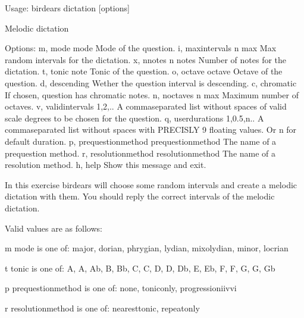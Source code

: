 \documentclass[letterpaper,10pt,english]{sphinxmanual}
\begin{document}
\begin{sphinxVerbatim}[commandchars=\\\{\}]
Usage: birdears dictation [options]

  Melodic dictation

Options:
  \PYGZhy{}m, \PYGZhy{}\PYGZhy{}mode \PYGZlt{}mode\PYGZgt{}               Mode of the question.
  \PYGZhy{}i, \PYGZhy{}\PYGZhy{}max\PYGZus{}intervals \PYGZlt{}n max\PYGZgt{}     Max random intervals for the dictation.
  \PYGZhy{}x, \PYGZhy{}\PYGZhy{}n\PYGZus{}notes \PYGZlt{}n notes\PYGZgt{}         Number of notes for the dictation.
  \PYGZhy{}t, \PYGZhy{}\PYGZhy{}tonic \PYGZlt{}note\PYGZgt{}              Tonic of the question.
  \PYGZhy{}o, \PYGZhy{}\PYGZhy{}octave \PYGZlt{}octave\PYGZgt{}           Octave of the question.
  \PYGZhy{}d, \PYGZhy{}\PYGZhy{}descending                Wether the question interval is descending.
  \PYGZhy{}c, \PYGZhy{}\PYGZhy{}chromatic                 If chosen, question has chromatic notes.
  \PYGZhy{}n, \PYGZhy{}\PYGZhy{}n\PYGZus{}octaves \PYGZlt{}n max\PYGZgt{}         Maximum number of octaves.
  \PYGZhy{}v, \PYGZhy{}\PYGZhy{}valid\PYGZus{}intervals \PYGZlt{}1,2,..\PYGZgt{}  A comma\PYGZhy{}separated list without spaces
                                  of valid scale degrees to be chosen for the
                                  question.
  \PYGZhy{}q, \PYGZhy{}\PYGZhy{}user\PYGZus{}durations \PYGZlt{}1,0.5,n..\PYGZgt{}
                                  A comma\PYGZhy{}separated list without
                                  spaces with PRECISLY 9 floating values. Or
                                  \PYGZsq{}n\PYGZsq{} for default              duration.
  \PYGZhy{}p, \PYGZhy{}\PYGZhy{}prequestion\PYGZus{}method \PYGZlt{}prequestion\PYGZus{}method\PYGZgt{}
                                  The name of a pre\PYGZhy{}question method.
  \PYGZhy{}r, \PYGZhy{}\PYGZhy{}resolution\PYGZus{}method \PYGZlt{}resolution\PYGZus{}method\PYGZgt{}
                                  The name of a resolution method.
  \PYGZhy{}h, \PYGZhy{}\PYGZhy{}help                      Show this message and exit.

  In this exercise birdears will choose some random intervals and create a
  melodic dictation with them. You should reply the correct intervals of the
  melodic dictation.

  Valid values are as follows:

  \PYGZhy{}m \PYGZlt{}mode\PYGZgt{} is one of: major, dorian, phrygian, lydian, mixolydian, minor,
  locrian

  \PYGZhy{}t \PYGZlt{}tonic\PYGZgt{} is one of: A, A\PYGZsh{}, Ab, B, Bb, C, C\PYGZsh{}, D, D\PYGZsh{}, Db, E, Eb, F, F\PYGZsh{}, G,
  G\PYGZsh{}, Gb

  \PYGZhy{}p \PYGZlt{}prequestion\PYGZus{}method\PYGZgt{} is one of: none, tonic\PYGZus{}only, progression\PYGZus{}i\PYGZus{}iv\PYGZus{}v\PYGZus{}i

  \PYGZhy{}r \PYGZlt{}resolution\PYGZus{}method\PYGZgt{} is one of: nearest\PYGZus{}tonic, repeat\PYGZus{}only
\end{sphinxVerbatim}
\end{document}
